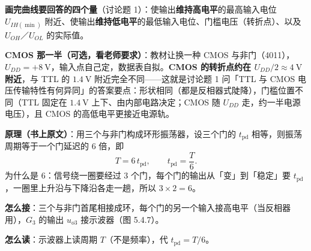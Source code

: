 \documentclass[11pt]{ctexart}
\let\origsubhdr\subhdr
\renewcommand{\subhdr}[1]{\needspace{3\baselineskip}\origsubhdr{#1}}
\begin{document}
\textbf{画完曲线要回答的四个量}（讨论题 1）：使输出\textbf{维持高电平}的最高输入电位 $U_{IH(\min)}$ 附近、使输出\textbf{维持低电平}的最低输入电位、门槛电压（转折点）、以及 $U_{OH}$／$U_{OL}$ 的实际值。


\textbf{CMOS 那一半（可选，看老师要求）}：教材让换一种 CMOS 与非门（4011），$U_{DD}=+8\ \mathrm{V}$，输入点自己定，数据表自拟。\textbf{CMOS 的转折点约在 $U_{DD}/2\approx4\ \mathrm{V}$ 附近}，与 TTL 的 $1.4\ \mathrm{V}$ 附近完全不同——这就是讨论题 1 问「TTL 与 CMOS 电压传输特性有何异同」的答案要点：形状相同（都是反相器式陡降），门槛位置不同（TTL 固定在 $1.4\ \mathrm{V}$ 上下、由内部电路决定；CMOS 随 $U_{DD}$ 走，约一半电源电压），且 CMOS 的高低电平更接近电源轨。


\textbf{原理（书上原文）}：用三个与非门构成环形振荡器，设三个门的 $t_{\mathrm{pd}}$ 相等，则振荡周期等于一个门延迟的 6 倍，即
\[
T=6\,t_{\mathrm{pd}},\qquad t_{\mathrm{pd}}=\frac{T}{6}.
\]
为什么是 6：信号绕一圈要经过 3 个门，每个门的输出从「变」到「稳定」要 $t_{\mathrm{pd}}$，一圈里上升沿与下降沿各走一趟，所以 $3\times2=6$。

\textbf{怎么接}：三个与非门首尾相接成环，每个门的另一个输入接高电平（当反相器用），$G_3$ 的输出 $u_{o3}$ 接示波器（图 5.4.7）。

\textbf{怎么读}：示波器上读周期 $T$（不是频率），代 $t_{\mathrm{pd}}=T/6$。

\end{document}
